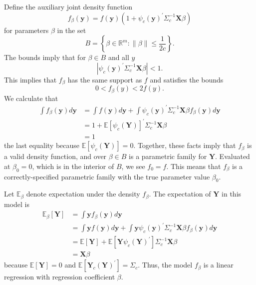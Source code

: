 \documentclass[10pt]{article}
\begin{document}
Define the auxiliary joint density function
$$
f_{\beta}(\boldsymbol{y})=f(\boldsymbol{y})\left(1+\psi_{c}(\boldsymbol{y})^{\prime} \Sigma_{c}^{-1} \boldsymbol{X} \beta\right)
$$
for parameters $\beta$ in the set
$$
B=\left\{\beta \in \mathbb{R}^{m}:\|\beta\| \leq \frac{1}{2 c}\right\} .
$$
The bounds imply that for $\beta \in B$ and all $y$
$$
\left|\psi_{c}(\boldsymbol{y})^{\prime} \Sigma_{c}^{-1} \boldsymbol{X} \beta\right|<1 .
$$
This implies that $f_{\beta}$ has the same support as $f$ and satisfies the bounds
$$
0<f_{\beta}(y)<2 f(y) .
$$
We calculate that
$$
\begin{aligned}
\int f_{\beta}(\boldsymbol{y}) d \boldsymbol{y} &=\int f(\boldsymbol{y}) d \boldsymbol{y}+\int \psi_{c}(\boldsymbol{y})^{\prime} \Sigma_{c}^{-1} \boldsymbol{X} \beta f_{\beta}(\boldsymbol{y}) d \boldsymbol{y} \\
&=1+\mathbb{E}\left[\psi_{c}(\boldsymbol{Y})\right]^{\prime} \Sigma_{c}^{-1} \boldsymbol{X} \beta \\
&=1
\end{aligned}
$$
the last equality because $\mathbb{E}\left[\psi_{c}(\boldsymbol{Y})\right]=0$. Together, these facts imply that $f_{\beta}$ is a valid density function, and over $\beta \in B$ is a parametric family for $\boldsymbol{Y}$. Evaluated at $\beta_{0}=0$, which is in the interior of $B$, we see $f_{0}=f$. This means that $f_{\beta}$ is a correctly-specified parametric family with the true parameter value $\beta_{0}$.

Let $\mathbb{E}_{\beta}$ denote expectation under the density $f_{\beta}$. The expectation of $\boldsymbol{Y}$ in this model is
$$
\begin{aligned}
\mathbb{E}_{\beta}[\boldsymbol{Y}] &=\int \boldsymbol{y} f_{\beta}(\boldsymbol{y}) d \boldsymbol{y} \\
&=\int \boldsymbol{y} f(\boldsymbol{y}) d \boldsymbol{y}+\int \boldsymbol{y} \psi_{c}(\boldsymbol{y})^{\prime} \Sigma_{c}^{-1} \boldsymbol{X} \beta f_{\beta}(\boldsymbol{y}) d \boldsymbol{y} \\
&=\mathbb{E}[\boldsymbol{Y}]+\mathbb{E}\left[\boldsymbol{Y} \psi_{c}(\boldsymbol{Y})^{\prime}\right] \Sigma_{c}^{-1} \boldsymbol{X} \beta \\
&=\boldsymbol{X} \beta
\end{aligned}
$$
because $\mathbb{E}[\boldsymbol{Y}]=0$ and $\mathbb{E}\left[\boldsymbol{Y}_{c}(\boldsymbol{Y})^{\prime}\right]=\Sigma_{c}$. Thus, the model $f_{\beta}$ is a linear regression with regression coefficient $\beta$.
\end{document}
